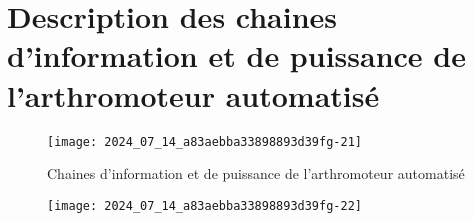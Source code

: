 \section{Description des chaines d'information et de puissance de l'arthromoteur automatisé}

\begin{figure}[!h]\centering
\texttt{[image: 2024\_07\_14\_a83aebba33898893d39fg-21]}
\caption{\label{fig:ccs_mp_2024:fig:33}Chaines d'information et de puissance de l'arthromoteur automatisé}
\end{figure}
\begin{figure}[!h]\centering
\texttt{[image: 2024\_07\_14\_a83aebba33898893d39fg-22]}
\end{figure}